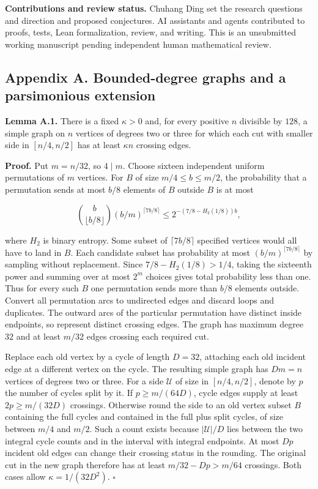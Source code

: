 \documentclass[
  10pt,
]{article}
\begin{document}
\textbf{Contributions and review status.} Chuhang Ding set the research questions and direction and proposed conjectures. AI assistants and agents contributed to proofs, tests, Lean formalization, review, and writing. This is an unsubmitted working manuscript pending
independent human mathematical review.

\subsection{Appendix A. Bounded-degree graphs and a parsimonious
extension}\label{appendix-a.-bounded-degree-graphs-and-a-parsimonious-extension}

\textbf{Lemma A.1.} There is a fixed \(\kappa>0\) and, for every
positive \(n\) divisible by \(128\), a simple graph on \(n\) vertices of
degrees two or three for which each cut with smaller side in
\([n/4,n/2]\) has at least \(\kappa n\) crossing edges.

\textbf{Proof.} Put \(m=n/32\), so \(4\mid m\). Choose sixteen
independent uniform permutations of \(m\) vertices. For \(B\) of size
\(m/4\le b\le m/2\), the probability that a permutation sends at most
\(b/8\) elements of \(B\) outside \(B\) is at most

\[
 \binom b{\lfloor b/8\rfloor}(b/m)^{\lceil7b/8\rceil}
       \le 2^{-(7/8-H_2(1/8))b},
\]

where \(H_2\) is binary entropy. Some subset of \(\lceil7b/8\rceil\)
specified vertices would all have to land in \(B\). Each candidate
subset has probability at most \((b/m)^{\lceil7b/8\rceil}\) by sampling
without replacement. Since \(7/8-H_2(1/8)>1/4\), taking the sixteenth
power and summing over at most \(2^m\) choices gives total probability
less than one. Thus for every such \(B\) one permutation sends more than
\(b/8\) elements outside. Convert all permutation arcs to undirected
edges and discard loops and duplicates. The outward arcs of the
particular permutation have distinct inside endpoints, so represent
distinct crossing edges. The graph has maximum degree \(32\) and at
least \(m/32\) edges crossing each required cut.

Replace each old vertex by a cycle of length \(D=32\), attaching each
old incident edge at a different vertex on the cycle. The resulting
simple graph has \(Dm=n\) vertices of degrees two or three. For a side
\(\mathcal U\) of size in \([n/4,n/2]\), denote by \(p\) the number of
cycles split by it. If \(p\ge m/(64D)\), cycle edges supply at least
\(2p\ge m/(32D)\) crossings. Otherwise round the side to an old vertex
subset \(B\) containing the full cycles and contained in the full plus
split cycles, of size between \(m/4\) and \(m/2\). Such a count exists
because \(|\mathcal U|/D\) lies between the two integral cycle counts
and in the interval with integral endpoints. At most \(Dp\) incident old
edges can change their crossing status in the rounding. The original cut
in the new graph therefore has at least \(m/32-Dp>m/64\) crossings. Both
cases allow \(\kappa=1/(32D^2)\). \(\square\)
\end{document}
